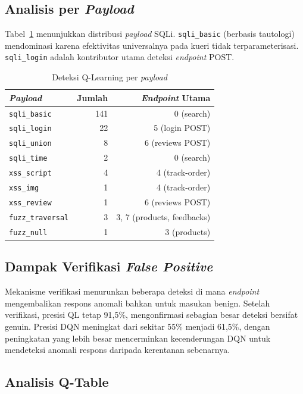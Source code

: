 \documentclass[a4paper,12pt]{article}
\begin{document}
\subsection{Analisis per \textit{Payload}}

Tabel~\ref{tab:per_payload} menunjukkan distribusi \textit{payload} SQLi. \texttt{sqli\_basic} (berbasis tautologi) mendominasi karena efektivitas universalnya pada kueri tidak terparameterisasi. \texttt{sqli\_login} adalah kontributor utama deteksi \textit{endpoint} POST.

\begin{table}[H]
\caption{Deteksi Q-Learning per \textit{payload}}
\centering
\small
\label{tab:per_payload}
\begin{tabular}{lrr}
\toprule
\textit{Payload} & Jumlah & \textit{Endpoint} Utama \\
\midrule
\texttt{sqli\_basic} & 141 & 0 (search) \\
\texttt{sqli\_login} & 22 & 5 (login POST) \\
\texttt{sqli\_union} & 8 & 6 (reviews POST) \\
\texttt{sqli\_time} & 2 & 0 (search) \\
\texttt{xss\_script} & 4 & 4 (track-order) \\
\texttt{xss\_img} & 1 & 4 (track-order) \\
\texttt{xss\_review} & 1 & 6 (reviews POST) \\
\texttt{fuzz\_traversal} & 3 & 3, 7 (products, feedbacks) \\
\texttt{fuzz\_null} & 1 & 3 (products) \\
\bottomrule
\end{tabular}
\end{table}

\subsection{Dampak Verifikasi \textit{False Positive}}

Mekanisme verifikasi menurunkan beberapa deteksi di mana \textit{endpoint} mengembalikan respons anomali bahkan untuk masukan benign. Setelah verifikasi, presisi QL tetap 91,5\%, mengonfirmasi sebagian besar deteksi bersifat genuin. Presisi DQN meningkat dari sekitar 55\% menjadi 61,5\%, dengan peningkatan yang lebih besar mencerminkan kecenderungan DQN untuk mendeteksi anomali respons daripada kerentanan sebenarnya.

\subsection{Analisis Q-Table}
\end{document}
